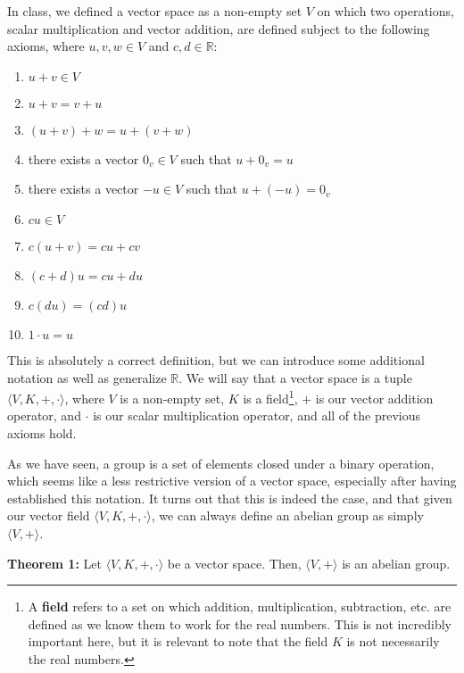 \documentclass[twoside]{article}
\newcommand{\R}{\mathbb{R}}
\begin{document}
In class, we defined a vector space as a non-empty set $V$ on which two operations,
scalar multiplication and vector addition, are defined subject to the following axioms,
where $u,v,w \in V$ and $c,d \in \R$:
\begin{enumerate}
    \item $u+v \in V$
    \item $u+v = v+u$
    \item $(u+v)+w = u+(v+w)$
    \item there exists a vector $0_v \in V$ such that $u+0_v = u$
    \item there exists a vector $-u \in V$ such that $u+(-u) = 0_v$
    \item $cu\in V$
    \item $c(u+v) = cu+cv$
    \item $(c+d)u = cu+du$
    \item $c(du) = (cd)u$
    \item $1 \cdot u = u$
\end{enumerate}
This is absolutely a correct definition, but we can introduce some additional 
notation as well as generalize $\R$. We will say that a vector space is a tuple 
$\langle V, K, +, \cdot \rangle$, where $V$ is a non-empty set, $K$ is a field\footnote[2]{A \textbf{field} refers to a set on which addition, multiplication, subtraction, etc. are defined as we know them to work for the real numbers. This is not incredibly important here, but it is relevant to note that the field $K$ is not necessarily the real numbers.},
$+$ is our vector addition operator, and $\cdot$ is our scalar multiplication operator,
and all of the previous axioms hold.

As we have seen, a group is a set of elements closed under a binary operation, which 
seems like a less restrictive version of a vector space, especially after having 
established this notation. It turns out that this is indeed the case, and that 
given our vector field $\langle V, K, +, \cdot \rangle$, we can always define 
an abelian group as simply $\langle V, + \rangle$.

\begin{mdframed}[roundcorner=10pt, backgroundcolor=gray!10]
  \textbf{Theorem 1:} Let $\langle V, K, +, \cdot \rangle$ be a vector space. Then,
  $\langle V, + \rangle$ is an abelian group.
\end{mdframed}
\end{document}
